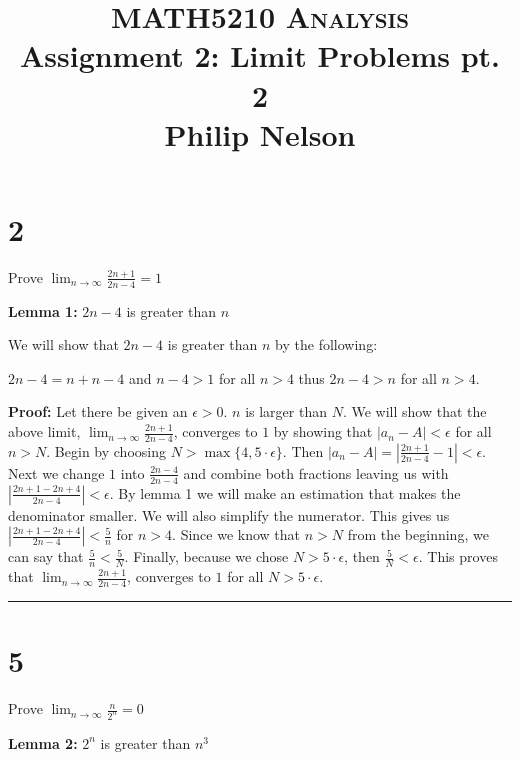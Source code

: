 \documentclass[12pt]{article}
\newcommand\qedsym{\hfill \rule{2mm}{2mm}}
\begin{document}
\baselineskip=14.0pt

\title{MATH5210 \textsc{Analysis}
  \\ Assignment 2: Limit Problems pt. 2
  \\ Philip Nelson
}
\date{}

\maketitle

\vspace{-0.5in}

\section*{2}
Prove $\lim_{n\to \infty}\frac{2n+1}{2n-4} = 1$

\bigskip

\textbf{Lemma 1:} $2n-4$ is greater than $n$

We will show that $2n-4$ is greater than $n$ by the following:

$2n-4 = n + n - 4$ and $n - 4 > 1$ for all $n > 4$ thus $2n - 4 > n$ for all $n > 4$.

\bigskip

\textbf{Proof:} Let there be given an $\epsilon > 0$. $n$ is larger than $N$. We will show that the above limit, $\lim_{n\to \infty}\frac{2n+1}{2n-4}$, converges to $1$ by showing that $|a_n - A| < \epsilon$ for all $n > N$. Begin by choosing $N > \max\{4, 5 \cdot \epsilon\}$. Then $|a_n - A| = |\frac{2n+1}{2n-4} - 1 | < \epsilon$. Next we change $1$ into $\frac{2n-4}{2n-4}$ and combine both fractions leaving us with $|\frac{2n+1-2n+4}{2n-4}| < \epsilon$. By lemma 1 we will make an estimation that makes the denominator smaller. We will also simplify the numerator. This gives us $|\frac{2n+1-2n+4}{2n-4}| < \frac{5}{n}$ for $n>4$. Since we know that $n > N$ from the beginning, we can say that $\frac{5}{n} < \frac{5}{N}$. Finally, because we chose $N > 5 \cdot \epsilon$, then $\frac{5}{N} < \epsilon$. This proves that $\lim_{n\to \infty}\frac{2n+1}{2n-4}$, converges to $1$ for all $N > 5\cdot \epsilon$. \qedsym{}

\section*{5}
Prove $\lim_{n\to \infty}\frac{n}{2^n} = 0$

\bigskip

\textbf{Lemma 2:} $2^n$ is greater than $n^3$
\end{document}
